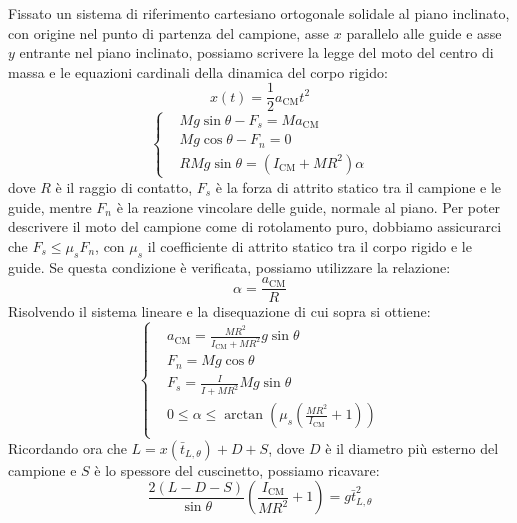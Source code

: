 \documentclass{article}
\begin{document}
Fissato un sistema di riferimento cartesiano ortogonale solidale
al piano inclinato, con origine nel punto di partenza del campione,
asse $x$ parallelo alle guide e asse $y$ entrante nel piano inclinato,
possiamo scrivere la legge del moto del centro di massa e le
equazioni cardinali della dinamica del corpo rigido:
\[x(t) = \frac{1}{2} a_\text{CM} t^2\]
\[\left\{\begin{aligned}
    &M g \sin\theta - F_s = M a_\text{CM} \\
    &M g \cos\theta - F_n = 0 \\
    &R M g \sin\theta = \left(I_\text{CM} + M R^2\right) \alpha
\end{aligned}\right.\]
dove $R$ è il raggio di contatto, $F_s$ è la forza di attrito statico
tra il campione e le guide, mentre $F_n$ è la reazione vincolare delle
guide, normale al piano.
Per poter descrivere il moto del campione come di rotolamento puro,
dobbiamo assicurarci che $F_s \le \mu_s F_n$, con $\mu_s$ il
coefficiente di attrito statico tra il corpo rigido e le guide.
Se questa condizione è verificata, possiamo utilizzare la relazione:
\[\alpha = \frac{a_\text{CM}}{R}\]
Risolvendo il sistema lineare e la disequazione di cui sopra si ottiene:
\[\left\{\begin{aligned}
    &a_\text{CM} = \frac{M R^2}{I_\text{CM} + M R^2} g\sin\theta \\
    &F_n = M g \cos\theta \\
    &F_s = \frac{I}{I + M R^2} M g \sin\theta \\
    & 0 \le \alpha \le \arctan\left(\mu_s \left(\frac{MR^2}{I_\text{CM}} + 1\right)\right) \\
\end{aligned}\right.\]
Ricordando ora che $L = x(\bar{t}_{L,\theta}) + D + S$, dove $D$ è il diametro
più esterno del campione e $S$ è lo spessore del cuscinetto, possiamo ricavare:
\[
    \frac{2(L-D-S)}{\sin\theta}\left(\frac{I_\text{CM}}{M R^2} + 1\right) = g \bar{t}^2_{L,\theta}
\]
\end{document}

